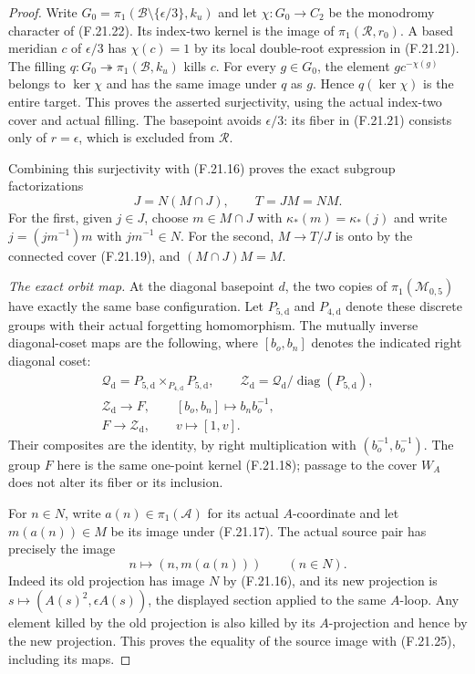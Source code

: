 \begin{proof}
Write $G_0=\pi_1(\mathscr B\setminus\{\epsilon/3\},k_u)$
and let $\chi:G_0\to C_2$ be the monodromy character
of (F.21.22). Its index-two kernel is the image of
$\pi_1(\mathscr R,r_0)$.
A based meridian $c$ of $\epsilon/3$ has $\chi(c)=1$
by its local double-root expression in (F.21.21).
The filling $q:G_0\twoheadrightarrow\pi_1(\mathscr B,k_u)$
kills $c$. For every $g\in G_0$, the element
$g c^{-\chi(g)}$ belongs to $\ker\chi$ and has the same
image under $q$ as $g$. Hence $q(\ker\chi)$ is the
entire target. This proves the asserted surjectivity,
using the actual index-two cover and actual filling.
The basepoint avoids $\epsilon/3$: its fiber in
(F.21.21) consists only of $r=\epsilon$, which is
excluded from $\mathscr R$.

Combining this surjectivity with (F.21.16) proves the
exact subgroup factorizations
\[
                       J=N(M\cap J),\qquad T=JM=NM .
                                                               \tag{F.21.23}
\]
For the first, given $j\in J$, choose $m\in M\cap J$
with $\kappa_*(m)=\kappa_*(j)$ and write
$j=(jm^{-1})m$ with $jm^{-1}\in N$.
For the second, $M\to T/J$ is onto by the connected
cover (F.21.19), and $(M\cap J)M=M$.

\emph{The exact orbit map.}
At the diagonal basepoint $d$, the two copies of
$\pi_1(\mathcal M_{0,5})$ have exactly the same
base configuration. Let $P_{5,\mathrm d}$ and
$P_{4,\mathrm d}$ denote these discrete groups with
their actual forgetting homomorphism. The mutually
inverse diagonal-coset maps are the following, where
$[b_o,b_n]$ denotes the indicated right diagonal coset:
\[
 \begin{gathered}
 \mathcal Q_{\mathrm d}
     =P_{5,\mathrm d}\mathbin{\times}_{P_{4,\mathrm d}}P_{5,\mathrm d},
 \qquad
 \mathcal Z_{\mathrm d}
     =\mathcal Q_{\mathrm d}/\operatorname{diag}(P_{5,\mathrm d}),\\
 \mathcal Z_{\mathrm d}\longrightarrow F,
        \qquad[b_o,b_n]\longmapsto b_nb_o^{-1},\\
 F\longrightarrow\mathcal Z_{\mathrm d},
        \qquad v\longmapsto[1,v].
 \end{gathered}                                               \tag{F.21.24}
\]
Their composites are the identity, by right
multiplication with $(b_o^{-1},b_o^{-1})$.
The group $F$ here is the same one-point kernel
(F.21.18); passage to the cover $W_A$ does not
alter its fiber or its inclusion.

For $n\in N$, write $a(n)\in\pi_1(\mathscr A)$ for
its actual $A$-coordinate and let $m(a(n))\in M$
be its image under (F.21.17).
The actual source pair has precisely the image
\[
                   n\longmapsto(n,m(a(n)))\qquad(n\in N).
                                                               \tag{F.21.25}
\]
Indeed its old projection has image $N$ by
(F.21.16), and its new projection is
$s\mapsto(A(s)^2,\epsilon A(s))$, the displayed
section applied to the same $A$-loop.
Any element killed by the old projection is also
killed by its $A$-projection and hence by the new
projection. This proves the equality of the source
image with (F.21.25), including its maps.


\end{proof}
